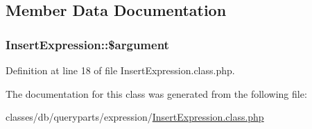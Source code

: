 \subsection{Member Data Documentation}
\hypertarget{classInsertExpression_a0a8efa361a069392a3cca64a675023e0}{
\subsubsection[{\$argument}]{\setlength{\rightskip}{0pt plus 5cm}Insert\-Expression\-::\$argument}}\label{classInsertExpression_a0a8efa361a069392a3cca64a675023e0}


Definition at line 18 of file Insert\-Expression.\-class.\-php.



The documentation for this class was generated from the following file\-:\begin{DoxyCompactItemize}
\item 
classes/db/queryparts/expression/\hyperlink{InsertExpression_8class_8php}{Insert\-Expression.\-class.\-php}\end{DoxyCompactItemize}
